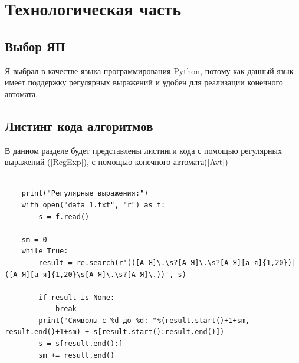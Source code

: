 \documentclass[12pt]{report}
\begin{document}
\chapter{Технологическая часть}
\section{Выбор ЯП}
Я выбрал в качестве языка программирования Python, потому как данный язык имеет поддержку регулярных выражений и удобен для реализации конечного автомата.

\section{Листинг кода алгоритмов}
В данном разделе будет представлены листинги кода с помощью регулярных выражений (\ref{RegExp}), с помощью конечного автомата(\ref{Avt})
\begin{lstlisting}[label=RegExp,caption = Использование регулярных выражений]

    print("Регулярные выражения:")
    with open("data_1.txt", "r") as f:
        s = f.read()

    sm = 0
    while True:
        result = re.search(r'(([А-Я]\.\s?[А-Я]\.\s?[А-Я][а-я]{1,20})|([А-Я][а-я]{1,20}\s[А-Я]\.\s?[А-Я]\.))', s)

        if result is None:
            break
        print("Символы с %d до %d: "%(result.start()+1+sm, result.end()+1+sm) + s[result.start():result.end()])
        s = s[result.end():]
        sm += result.end()

\end{lstlisting}
\end{document}
